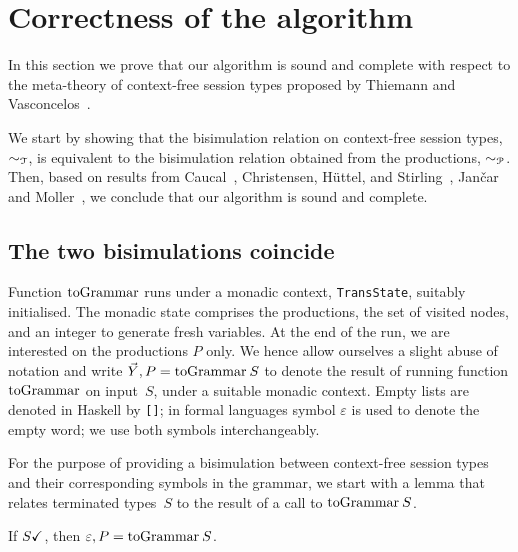 \section{Correctness of the algorithm}
\label{sec:soundness}

In this section we prove that our algorithm is sound and complete
with respect to the meta-theory of context-free session types proposed
by Thiemann and Vasconcelos~\cite{thiemann2016context}.

We start by showing that the bisimulation relation on context-free
session types, $\sim_\mathcal T$, is equivalent to the bisimulation
relation obtained from the productions, $\sim_\mathcal P$.  Then, based on
results from Caucal~\cite{caucal1986decidabilite}, Christensen,
H{\"{u}}ttel, and Stirling~\cite{DBLP:journals/iandc/ChristensenHS95},
Jan{\v{c}}ar and Moller~\cite{janvcar1999techniques}, we conclude that
our algorithm is sound and complete.

\subsection{The two bisimulations coincide}

Function $\toGrammark$ runs under a monadic context,
\lstinline|TransState|, suitably initialised.
%
The monadic state comprises the productions, the set of visited nodes,
and an integer to generate fresh variables. At the end of the run, we
are interested on the productions $P$ only.
%
We hence allow ourselves a slight abuse of notation and write
$\vec Y,P = \toGrammarf S$ to denote the result of running function
$\toGrammark$ on input~$S$, under a suitable monadic context.
%
Empty lists are denoted in Haskell by \lstinline|[]|;
in formal languages symbol $\varepsilon$ is used to denote the empty
word; we use both symbols interchangeably.


For the purpose of providing a bisimulation between context-free
session types and their corresponding symbols in the grammar, we start
with a lemma that relates terminated types~$S$ to the result of a call
to $\toGrammarf S$.

\begin{lemma}
  \label{lem:terminated-togrammar}
  If $S\checkmark$, then $\varepsilon,P=\toGrammarf S$.
\end{lemma}

